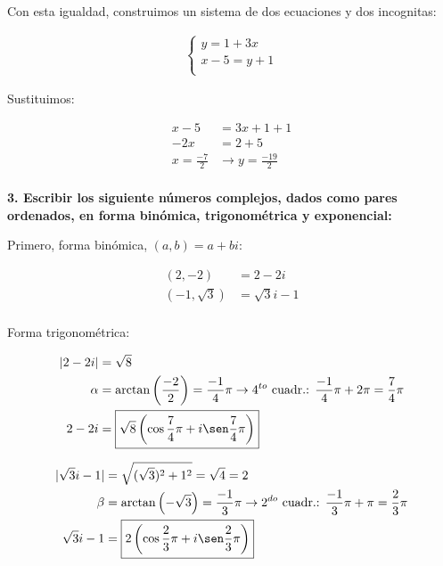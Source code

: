 \documentclass[12pt]{article}
\begin{document}
Con esta igualdad, construimos un sistema de dos ecuaciones y dos incognitas:

\begin{align*}
    \begin{cases}
        y = 1 + 3x    \\
        x - 5 = y + 1 \\
    \end{cases}
\end{align*}

Sustituimos:

\begin{align*}
    x - 5                    & = 3x + 1 + 1                          \\
    -2x                      & = 2 + 5                               \\
    \boxed{x = \frac{-7}{2}} & \rightarrow \boxed{y = \frac{-19}{2}} \\
\end{align*}

\textbf{3. Escribir los siguiente números complejos, dados como pares ordenados,
    en forma binómica, trigonométrica y exponencial:}

Primero, forma binómica, \((a,b) = a + bi\):

\begin{align*}
    (2, -2)        & = \boxed{2 - 2i}        \\
    (-1, \sqrt{3}) & = \boxed{\sqrt{3}i - 1} \\
\end{align*}

Forma trigonométrica:

\begin{align*}
    |2 - 2i| & = \sqrt{8}                                                                                                                       \\
    \alpha   & = \arctan \left(\frac{-2}{2}\right) = \frac{-1}{4}\pi \rightarrow 4^{to}\text{ cuadr.: } \frac{-1}{4}\pi + 2\pi = \frac{7}{4}\pi \\
    2 - 2i   & = \boxed{\sqrt{8}\left(\cos \frac{7}{4}\pi + i \sen \frac{7}{4}\pi\right)}                                                       \\
\end{align*}

\begin{align*}
    |\sqrt{3}i - 1| & = \sqrt{(\sqrt{3})^2 + 1^2} = \sqrt{4} = 2                                                                                   \\
    \beta           & = \arctan \left(-\sqrt{3}\right) = \frac{-1}{3}\pi \rightarrow 2^{do}\text{ cuadr.: } \frac{-1}{3}\pi + \pi = \frac{2}{3}\pi \\
    \sqrt{3}i - 1   & = \boxed{2\left(\cos \frac{2}{3}\pi + i \sen \frac{2}{3}\pi\right)}                                                          \\
\end{align*}
\end{document}
